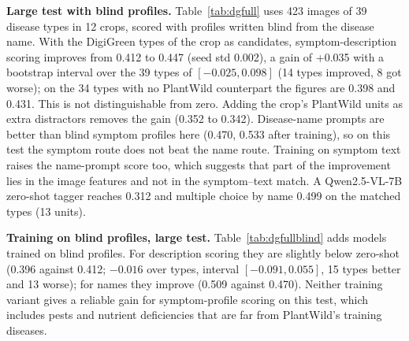 \documentclass[11pt]{article}
\begin{document}
\textbf{Large test with blind profiles.} Table~\ref{tab:dgfull} uses 423 images of 39 disease types in 12 crops, scored with profiles written blind from the disease name. With the DigiGreen types of the crop as candidates, symptom-description scoring improves from 0.412 to 0.447 (seed std 0.002), a gain of +0.035 with a bootstrap interval over the 39 types of $[-0.025, 0.098]$ (14 types improved, 8 got worse); on the 34 types with no PlantWild counterpart the figures are 0.398 and 0.431. This is not distinguishable from zero. Adding the crop's PlantWild units as extra distractors removes the gain (0.352 to 0.342). Disease-name prompts are better than blind symptom profiles here (0.470, 0.533 after training), so on this test the symptom route does not beat the name route. Training on symptom text raises the name-prompt score too, which suggests that part of the improvement lies in the image features and not in the symptom--text match. A Qwen2.5-VL-7B zero-shot tagger reaches 0.312 and multiple choice by name 0.499 on the matched types (13 units).
\begin{table}[t]\centering\small
\resizebox{\linewidth}{!}{}
\caption{Large DigiGreen test (423 images, 39 types, 12 crops; types-macro top-1, crop given). Supervised: mean $\pm$ std over three seeds of the symptom-only training recipe, trained without any PlantWild unit that matches a DigiGreen disease. Profiles are written blind by an LLM from the disease name. ``Unmatched only'' = the 34 types with no PlantWild counterpart.}\label{tab:dgfull}
\end{table}

\textbf{Training on blind profiles, large test.} Table~\ref{tab:dgfullblind} adds models trained on blind profiles. For description scoring they are slightly below zero-shot (0.396 against 0.412; $-0.016$ over types, interval $[-0.091, 0.055]$, 15 types better and 13 worse); for names they improve (0.509 against 0.470). Neither training variant gives a reliable gain for symptom-profile scoring on this test, which includes pests and nutrient deficiencies that are far from PlantWild's training diseases.
\begin{table}[t]\centering\small
\resizebox{\linewidth}{!}{}
\caption{Large DigiGreen test, types-macro top-1, three seeds (mean $\pm$ std). The two training columns differ only in the text used for the training diseases (image-derived tags or blind LLM profiles).}\label{tab:dgfullblind}
\end{table}
\end{document}
